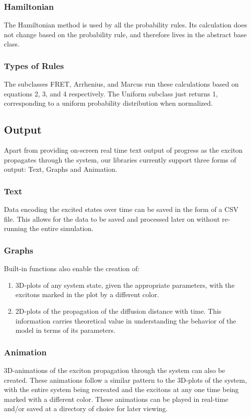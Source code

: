 \documentclass{article}
\begin{document}
\subsubsection{Hamiltonian}

The Hamiltonian method is used by all the probability rules. Its calculation does not change based on the probability rule, and therefore lives in the abstract base class.



\subsubsection{Types of Rules}

The subclasses FRET, Arrhenius, and Marcus run these calculations based on equations 2, 3, and 4 respectively. The Uniform subclass just returns 1, corresponding to a uniform probability distribution when normalized.


\subsection{Output}
Apart from providing on-screen real time text output of progress as the exciton propagates through the system, our libraries currently support three forms of output: Text, Graphs and Animation.

\subsubsection{Text}
Data encoding the excited states over time can be saved in the form of a CSV file. This allows for the data to be saved and processed later on without re-running the entire simulation.
\subsubsection{Graphs}
Built-in functions also enable the creation of:

\begin{enumerate}
    \item 3D-plots of any system state, given the appropriate parameters, with the excitons marked in the plot by a different color. 
    \item 2D-plots of the propagation of the diffusion distance with time. This information carries theoretical value in understanding the behavior of the model in terms of its parameters.
\end{enumerate}
\subsubsection{Animation}
3D-animations of the exciton propagation through the system can also be created. These animations follow a similar pattern to the 3D-plots of the system, with the entire system being recreated and the excitons at any one time being marked with a different color. These animations can be played in real-time and/or saved at a directory of choice for later viewing. 
\end{document}
